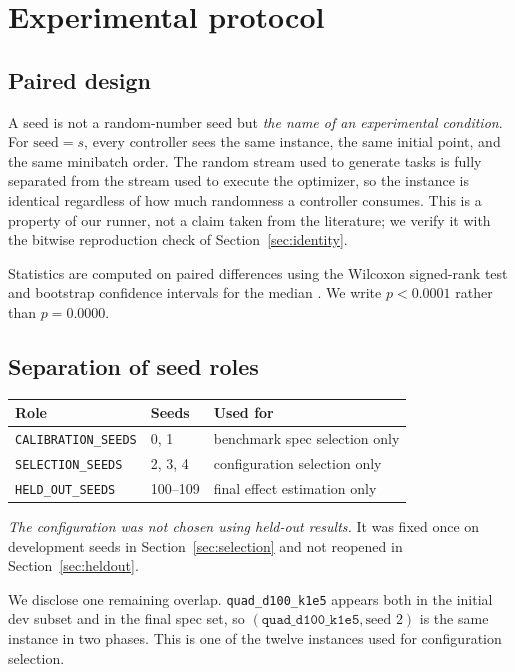 \section{Experimental protocol}
\label{sec:protocol}

\subsection{Paired design}
\label{sec:paired}

A seed is not a random-number seed but \emph{the name of an experimental
condition}. For $\text{seed} = s$, every controller sees the same instance, the
same initial point, and the same minibatch order. The random stream used to
generate tasks is fully separated from the stream used to execute the optimizer,
so the instance is identical regardless of how much randomness a controller
consumes. This is a property of our runner, not a claim taken from the
literature; we verify it with the bitwise reproduction check of
Section~\ref{sec:identity}.

Statistics are computed on paired differences using the Wilcoxon signed-rank test
\citep{wilcoxon1945} and bootstrap confidence intervals for the median
\citep{efron1979bootstrap}. We write $p < 0.0001$ rather than $p = 0.0000$.

\subsection{Separation of seed roles}
\label{sec:seeds}

\begin{center}
\begin{tabular}{lll}
\toprule
Role & Seeds & Used for \\
\midrule
\texttt{CALIBRATION\_SEEDS} & 0, 1        & benchmark spec selection only \\
\texttt{SELECTION\_SEEDS}   & 2, 3, 4     & configuration selection only \\
\texttt{HELD\_OUT\_SEEDS}   & 100--109    & final effect estimation only \\
\bottomrule
\end{tabular}
\end{center}

\emph{The configuration was not chosen using held-out results.} It was fixed once
on development seeds in Section~\ref{sec:selection} and not reopened in
Section~\ref{sec:heldout}.

We disclose one remaining overlap. \texttt{quad\_d100\_k1e5} appears both in the
initial dev subset and in the final spec set, so
$(\texttt{quad\_d100\_k1e5}, \text{seed } 2)$ is the same instance in two phases.
This is one of the twelve instances used for configuration selection.

